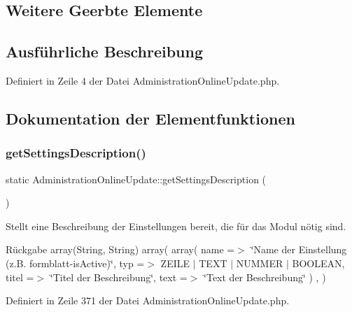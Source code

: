 \subsection*{Weitere Geerbte Elemente}


\subsection{Ausführliche Beschreibung}


Definiert in Zeile 4 der Datei Administration\+Online\+Update.\+php.



\subsection{Dokumentation der Elementfunktionen}
\mbox{\label{class_administration_online_update_a212c1f3ce7be4ae56272e09c32b18677}} 
\subsubsection{\texorpdfstring{get\+Settings\+Description()}{getSettingsDescription()}}
{\footnotesize\ttfamily static Administration\+Online\+Update\+::get\+Settings\+Description (\begin{DoxyParamCaption}{ }\end{DoxyParamCaption})\hspace{0.3cm}{\ttfamily [static]}}

Stellt eine Beschreibung der Einstellungen bereit, die für das Modul nötig sind. \begin{DoxyReturn}{Rückgabe}
array(\+String, String) array( array( \textquotesingle{}name\textquotesingle{} =$>$ \char`\"{}\+Name der Einstellung (z.\+B. formblatt-\/is\+Active)\char`\"{}, \textquotesingle{}typ\textquotesingle{} =$>$ Z\+E\+I\+LE $\vert$ T\+E\+XT $\vert$ N\+U\+M\+M\+ER $\vert$ B\+O\+O\+L\+E\+AN, \textquotesingle{}titel\textquotesingle{} =$>$ \char`\"{}\+Titel der Beschreibung\char`\"{}, \textquotesingle{}text\textquotesingle{} =$>$ \char`\"{}\+Text der Beschreibung\char`\"{} ) , ) 
\end{DoxyReturn}


Definiert in Zeile 371 der Datei Administration\+Online\+Update.\+php.


